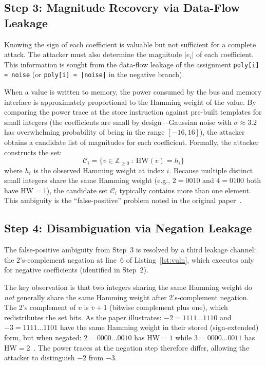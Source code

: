 \documentclass[sigconf,nonacm]{acmart}
\begin{document}
\subsection{Step 3: Magnitude Recovery via Data-Flow Leakage}

Knowing the sign of each coefficient is valuable but not sufficient for a complete
attack. The attacker must also determine the magnitude $|e_i|$ of each coefficient.
This information is sought from the data-flow leakage of the assignment
\texttt{poly[i] = noise} (or \texttt{poly[i] = |noise|} in the negative branch).

When a value is written to memory, the power consumed by the bus and memory interface
is approximately proportional to the Hamming weight of the value. By comparing the
power trace at the store instruction against pre-built templates for small integers
(the coefficients are small by design---Gaussian noise with $\sigma \approx 3.2$ has
overwhelming probability of being in the range $[-16, 16]$), the attacker obtains a
candidate list of magnitudes for each coefficient. Formally, the attacker constructs
the set:
\[
  \mathcal{C}_i = \bigl\{ v \in \mathbb{Z}_{\geq 0}\ :\ \mathrm{HW}(v) = h_i \bigr\}
\]
where $h_i$ is the observed Hamming weight at index $i$. Because multiple distinct
small integers share the same Hamming weight (e.g., $2 = 0010$ and $4 = 0100$ both
have $\mathrm{HW} = 1$), the candidate set $\mathcal{C}_i$ typically contains more
than one element. This ambiguity is the ``false-positive'' problem noted in the
original paper~\cite{aydin2022reveal}.

\subsection{Step 4: Disambiguation via Negation Leakage}

The false-positive ambiguity from Step~3 is resolved by a third leakage channel:
the 2's-complement negation at line~6 of Listing~\ref{lst:vuln}, which executes
only for negative coefficients (identified in Step~2).

The key observation is that two integers sharing the same Hamming weight do
\emph{not} generally share the same Hamming weight after 2's-complement negation.
The 2's complement of $v$ is $\bar{v} + 1$ (bitwise complement plus one), which
redistributes the set bits. As the paper illustrates:
$-2 = 1111\ldots1110$ and $-3 = 1111\ldots1101$ have the same Hamming weight
in their stored (sign-extended) form, but when negated:
$2 = 0000\ldots0010$ has $\mathrm{HW} = 1$ while $3 = 0000\ldots0011$ has
$\mathrm{HW} = 2$~\cite{aydin2022reveal}. The power traces at the negation step
therefore differ, allowing the attacker to distinguish $-2$ from $-3$.
\end{document}
